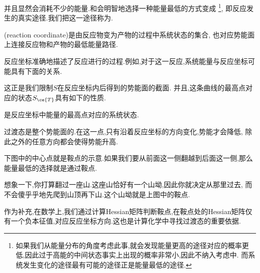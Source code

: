 \documentclass{ctexart}
\begin{document}
并且显然会消耗不少的能量.和会明智地选择一种能量最低的方式变成%
\footnote{如果我们从能量分布的角度考虑此事,就会发现能量更高的途径对应的概率更低,因此过于高能的中间状态事实上出现的概率非常小,因此不纳入考虑中.%
而系统发生变化的途径最有可能的途径正是能量最低的途径.},%
即反应发生的真实途径.我们把这一途径称为.
\begin{definition}[7E.2.2 反应坐标]
    (reaction coordinate)是由反应物变为产物的过程中系统状态的集合,%
    也对应势能面上连接反应物和产物的最低能量路径.
\end{definition}
反应坐标准确地描述了反应进行的过程.例如,对于这一反应,系统能量与反应坐标可能具有下面的关系.
\begin{figure}[H]
    \centering
\end{figure}
这正是我们限制$S$在反应坐标内后得到的势能面的截面.%
并且,这条曲线的最高点对应的状态$S_{\ce{T}}$具有如下的性质.
\begin{definition}[7E.2.3 过渡态]
    是反应坐标中能量的最高点对应的系统状态.%
\end{definition}
\begin{theorem}[7E.2.4 过渡态的数学意义]
    过渡态是整个势能面的.在这一点,只有沿着反应坐标的方向变化,势能才会降低,%
    除此之外的任意方向都会使得势能升高.
\end{theorem}
下图中的中心点就是鞍点的示意.如果我们要从前面这一侧翻越到后面这一侧,那么能量最低的选择就是通过鞍点.
\begin{tightcenter}
    
\end{tightcenter}
想象一下,你打算翻过一座山.这座山恰好有一个山坳,因此你就决定从那里过去,%
而不会傻乎乎地先爬到山顶再下山.这个山坳就是上图中的鞍点.
\begin{hint}
    作为补充,在数学上,我们通过计算Hessian矩阵判断鞍点,在鞍点处的Hessian矩阵仅有一个负本征值,对应反应坐标方向.这也是计算化学中寻找过渡态的重要依据.
\end{hint}
\end{document}
